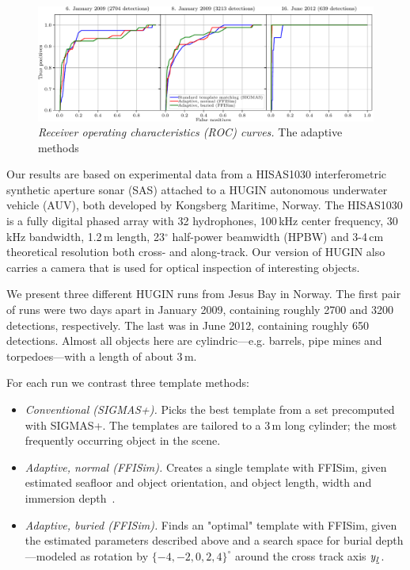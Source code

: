 \begin{figure}[t]\centering%
\includegraphics[width=\linewidth]{gfx/fig_rocs.pdf}%
\caption{\emph{Receiver operating characteristics (ROC) curves.} The adaptive methods }\label{IV_fig_roc_curves}%
\end{figure}

Our results are based on experimental data from a HISAS1030 interferometric synthetic aperture sonar (SAS) attached to a HUGIN autonomous underwater vehicle (AUV), both developed by Kongsberg Maritime, Norway. The HISAS1030 is a fully digital phased array with 32 hydrophones, 100\,kHz center frequency, 30\,kHz bandwidth, 1.2\,m length, 23$^\circ$ half-power beamwidth (HPBW) and 3-4\,cm theoretical resolution both cross- and along-track. Our version of HUGIN also carries a camera that is used for optical inspection of interesting objects.


We present three different HUGIN runs from Jesus Bay in Norway. The first pair of runs were two days apart in January 2009, containing roughly 2700 and 3200 detections, respectively. The last was in June 2012, containing roughly 650 detections. Almost all objects here are cylindric---e.g. barrels, pipe mines and torpedoes---with a length of about 3\,m.

For each run we contrast three template methods:
%
\begin{itemize}
\item \emph{Conventional (SIGMAS+).} Picks the best template from a set precomputed with SIGMAS+. The templates are tailored to a 3\,m long cylinder; the most frequently occurring object in the scene.
\item \emph{Adaptive, normal (FFISim).} Creates a single template with FFISim, given estimated seafloor and object orientation, and object length, width and immersion depth~\cite{Midelfart2010}. 
\item \emph{Adaptive, buried (FFISim).} Finds an "optimal" template with FFISim, given the estimated parameters described above and a search space for burial depth---modeled as rotation by $\{-4,-2,0,2,4\}^\circ$ around the cross track axis $y_\textrm{\tiny$\uvec{I}$}$.
\end{itemize}

